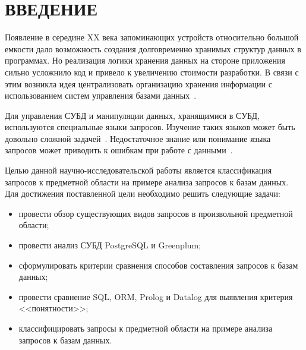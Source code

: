 \chapter*{ВВЕДЕНИЕ}

Появление в середине XX века запоминающих устройств относительно большой емкости дало возможность создания долговременно хранимых структур данных в программах. Но реализация логики хранения данных на стороне приложения сильно усложнило код и привело к увеличению стоимости разработки. В связи с этим возникла идея централизовать организацию хранения информации с использованием систем управления базами данных~\cite{стасышин2022проектирование}.

Для управления СУБД и манипуляции данных, хранящимися в СУБД, используются специальные языки запросов. Изучение таких языков может быть довольно сложной задачей~\cite{невский2022применение}. Недостаточное знание или понимание языка запросов может приводить к ошибкам при работе с данными~\cite{гарскова2005базы}.

Целью данной научно-исследовательской работы является классификация запросов к предметной области на примере анализа запросов к базам данных. Для достижения поставленной цели необходимо решить следующие задачи:

\begin{itemize}
	\item провести обзор существующих видов запросов в произвольной предметной области;
	\item провести анализ СУБД PostgreSQL и Greenplum;
	\item сформулировать критерии сравнения способов составления запросов к базам данных;
	\item провести сравнение SQL, ORM, Prolog и Datalog для выявления критерия <<понятности>>;
	\item классифицировать запросы к предметной области на примере анализа запросов к базам данных.
\end{itemize}